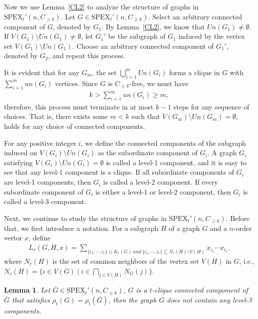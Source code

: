 \documentclass[preprint,12pt]{elsarticle}
\newtheorem{lem}[thm]{Lemma}
\begin{document}
        Now we use Lemma~\ref{CL2} to analyze the structure of graphs in $\mathrm{SPEX}_t'(n, C_{\geq k})$. Let $G \in \mathrm{SPEX}_t'(n, C_{\geq k})$. Select an arbitrary connected component of $G$, denoted by $G_1$. By Lemma~\ref{CL2}, we know that $Un(G_1) \neq \emptyset$. If $V(G_1) \setminus Un(G_1) \neq \emptyset$, let $G_1'$ be the subgraph of $G_1$ induced by the vertex set $V(G_1) \setminus Un(G_1)$. Choose an arbitrary connected component of $G_1'$, denoted by $G_2$, and repeat this process.

        It is evident that for any $G_m$, the set $\bigcup_{i=1}^m Un(G_i)$ forms a clique in $G$ with $\sum_{i=1}^m un(G_i)$ vertices. Since $G$ is $C_{\geq k}$-free, we must have
            \begin{align*}
                k > \sum_{i=1}^m un(G_i) \geq m,
	       \end{align*}
        therefore, this process must terminate in at most $k - 1$ steps for any sequence of choices. That is, there exists some $m < k$ such that $V(G_m) \setminus Un(G_m) = \emptyset$, holds for any choice of connected components.

        For any positive integer $i$, we define the connected components of the subgraph induced on $V(G_i) \setminus Un(G_i)$ as the subordinate component of $G_i$. A graph $G_i$ satisfying $V(G_i) \setminus Un(G_i) = \emptyset$ is called a level-1 component, and it is easy to see that any level-1 component is a clique. If all subordinate components of $G_i$ are level-1 components, then $G_i$ is called a level-2 component. If every subordinate component of $G_i$ is either a level-1 or level-2 component, then $G_i$ is called a level-3 component.




        Next, we continue to study the structure of graphs in $\mathrm{SPEX}_t'(n, C_{\geq k})$. Before that, we first introduce a notation. For a subgraph $H$ of a graph $G$ and a $n$-order vertor $x $, define
            \begin{align*}
                L_r(G, H, x) = \sum_{\{i_1,\cdots ,i_r\}\in K_r(G)\ and\ \{i_1,\cdots ,i_r\}\subseteq N_c(H)\setminus V(H)}x_{i_1}\cdots x_{i_r}.
            \end{align*}
        where $N_c(H)$ is the set of common neighbors of the vertex set $V(H) $ in $G $, i.e., $N_c(H) = \{ i \in V(G) \mid i \in \bigcap_{j \in V(H)} N_G(j) \}$.

        \begin{lem}\label{CL4}
                 Let $\bar{G} \in \mathrm{SPEX}_t'(n, C_{\geq k})$, $G $ is a $t$-clique connected compoment of $\bar{G} $ that satisfies $\rho_t(G) = \rho_t(\bar{G})$, then the graph $G$ does not contain any level-3 components.
        \end{lem}
\end{document}

